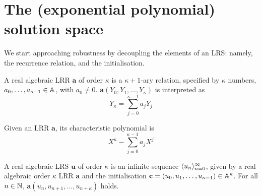 \section{The (exponential polynomial) solution space}
\label{section:solspace}

We start approaching robustness by decoupling the elements of an LRS: namely, the recurrence relation, and the initialisation.

\begin{definition}
\label{def:LRR}
A real algebraic LRR $\mathbf{a}$ of order $\kappa$ is a $\kappa+1$-ary relation, specified by $\kappa$ numbers, $a_0, \dots, a_{\kappa-1} \in \mathbb{A}$, with $a_0 \ne 0$. $\mathbf{a}(Y_0, Y_1, \dots, Y_\kappa)$ is interpreted as 
$$
Y_\kappa = \sum_{j=0}^{\kappa-1} a_j Y_j
$$
\end{definition}

\begin{definition}
\label{def:charpoly}
Given an LRR $\mathbf{a}$, its characteristic polynomial is
$$
X^{\kappa} - \sum_{j=0}^{\kappa-1}a_j X^j
$$
\end{definition}

\begin{definition}
\label{def:LRS}
A real algebraic LRS $\mathbf{u}$ of order $\kappa$ is an infinite sequence $\langle u_n\rangle_{n=0}^\infty$, given by a real algebraic order $\kappa$ LRR $\mathbf{a}$ and the initialisation $\mathbf{c} = (u_0, u_1, \dots, u_{\kappa-1}) \in \mathbb{A}^\kappa$. For all $n \in \mathbb{N}$, $\mathbf{a}(u_n, u_{n+1}, \dots, u_{n+\kappa})$ holds.
\end{definition}

